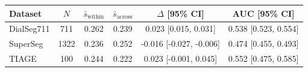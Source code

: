 \begin{tabular}{lccccc}
\toprule
Dataset & $N$ & $\bar{s}_\text{within}$ & $\bar{s}_\text{across}$ & $\Delta$ [95\% CI] & AUC [95\% CI] \\
\midrule
DialSeg711 & 711 & 0.262 & 0.239 & 0.023 [0.015, 0.031] & 0.538 [0.523, 0.554] \\
SuperSeg & 1322 & 0.236 & 0.252 & -0.016 [-0.027, -0.006] & 0.474 [0.455, 0.493] \\
TIAGE & 100 & 0.244 & 0.222 & 0.023 [-0.001, 0.045] & 0.552 [0.475, 0.585] \\
\bottomrule
\end{tabular}